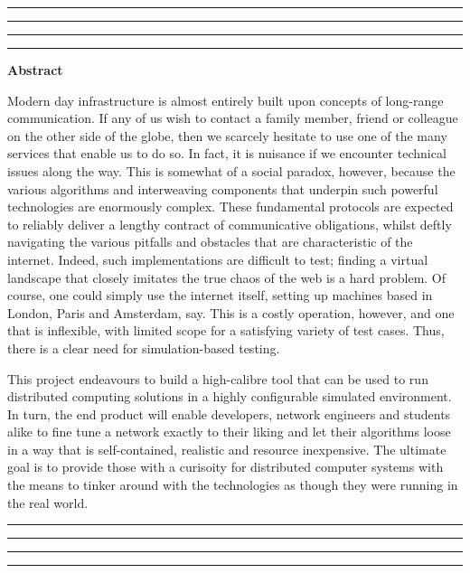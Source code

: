 \thispagestyle{empty}
\hrule\hrule\hrule\hrule %
\begin{center}
    \textbf{\large Abstract}
    \\
\end{center}

Modern day infrastructure is almost entirely built upon concepts of long-range communication. If any of us wish to
contact a family member, friend or colleague on the other side of the globe, then we scarcely hesitate to use one of
the many services that enable us to do so. In fact, it is nuisance if we encounter technical issues along the way. This
is somewhat of a social paradox, however, because the various algorithms and interweaving components that underpin
such powerful technologies are enormously complex. These fundamental protocols are expected to reliably deliver a
lengthy contract of communicative obligations, whilst deftly navigating the various pitfalls and obstacles that are
characteristic of the internet. Indeed, such implementations are difficult to test; finding a virtual landscape that
closely imitates the true chaos of the web is a hard problem. Of course, one could simply use the internet itself,
setting up machines based in London, Paris and Amsterdam, say. This is a costly operation, however, and one that is
inflexible, with limited scope for a satisfying variety of test cases. Thus, there is a clear need for
simulation-based testing.

This project endeavours to build a high-calibre tool that can be used to run distributed computing solutions in a
highly configurable simulated environment. In turn, the end product will enable developers, network engineers and
students alike to fine tune a network exactly to their liking and let their algorithms loose in a way that is
self-contained, realistic and resource inexpensive. The ultimate goal is to provide those with a curisoity for
distributed computer systems with the means to tinker around with the technologies as though they were running in the
real world.


\vfill
\hrule\hrule\hrule\hrule
\clearpage
